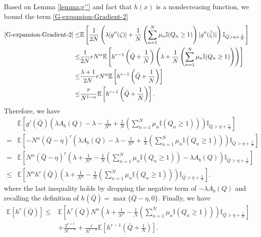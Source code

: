 \documentclass[11pt,oneside,letter]{article}
\begin{document}
Based on Lemma \ref{lemma:g''} and fact that $h(x)$ is a nondecreasing function, we bound the term \eqref{G-expansion-Gradient-2}
\begin{align}
 \eqref{G-expansion-Gradient-2}\leq&  \mathbb{E}\left[\frac{1}{2N}\left(\lambda |g''(\zeta)| + \frac{1}{N}\left(\sum_{n=1}^{N} \mu_n \mathbb{I}(Q_n\geq 1)\right)|g''(\tilde{\zeta})|\right)\mathbb{I}_{\bar Q > \eta+\frac{1}{N}}\right]\\
 \leq &\frac{1}{2N} rN^{\alpha} \mathbb{E}\left[{h^{r-1}}\left(\bar Q +{\frac{1}{N}}\right)\left(\lambda + \frac{1}{N}\left(\sum_{n=1}^{N} \mu_n \mathbb{I}(Q_n\geq 1)\right)\right)\right]\\
  \leq &\frac{\lambda+1}{2N} rN^{\alpha} \mathbb{E}\left[{h^{r-1}}\left(\bar Q +{\frac{1}{N}}\right)\right] \\
 \leq & \frac{r}{N^{1-\alpha}} \mathbb{E}\left[{h^{r-1}}\left(\bar Q +{\frac{1}{N}}\right)\right]. \label{Bound-2}
\end{align}
Therefore, we have 
\begin{align}
&\mathbb{E}\left[g'\left(\bar Q\right)\left(\lambda A_b(Q)- \lambda-\frac{1}{N^{\alpha}}+\frac{1}{N}\left(\sum_{n=1}^{N} \mu_n \mathbb{I}(Q_n\geq 1)\right) \right)\mathbb{I}_{\bar Q> \eta +\frac{1}{N}}\right]\\
=&\mathbb{E}\left[-N^{\alpha} \left(\bar Q-\eta\right)^{r} \left(\lambda A_b(Q)- \lambda-\frac{1}{N^{\alpha}}+\frac{1}{N}\left(\sum_{n=1}^{N} \mu_n \mathbb{I}(Q_n\geq 1)\right) \right)\mathbb{I}_{\bar Q> \eta +\frac{1}{N}}\right] \\
=&\mathbb{E}\left[N^{\alpha} \left(\bar Q-\eta\right)^{r} \left(\lambda+\frac{1}{N^{\alpha}}-\frac{1}{N}\left(\sum_{n=1}^{N} \mu_n \mathbb{I}(Q_n\geq 1)\right) -\lambda A_b(Q) \right)\mathbb{I}_{\bar Q> \eta +\frac{1}{N}}\right] \\
\leq &\mathbb{E}\left[N^{\alpha} h^r(\bar Q) \left(\lambda+\frac{1}{N^{\alpha}}-\frac{1}{N}\left(\sum_{n=1}^{N} \mu_n \mathbb{I}(Q_n\geq 1)\right)  \right)\mathbb{I}_{\bar Q> \eta +\frac{1}{N}}\right].
\end{align}
{where the last inequality holds by dropping the negative term of $-\lambda A_b(Q)$ and recalling the definition of $h(\bar Q)=\max\{\bar Q - \eta, 0\}$.}  
Finally, we have \begin{align}
\mathbb{E}\left[h^r\left(\bar Q\right)\right]
\leq &\mathbb{E}\left[h^r(\bar Q) N^{\alpha} \left(\lambda+\frac{1}{N^{\alpha}}-\frac{1}{N}\left(\sum_{n=1}^{N} \mu_n \mathbb{I}(Q_n\geq 1)\right)  \right)\mathbb{I}_{\bar Q> \eta +\frac{1}{N}}\right] \nonumber\\
&+ \frac{2^{r+1}}{ N^{r-\alpha}} + \frac{r}{N^{1-\alpha}} \mathbb{E}\left[{h^{r-1}}\left(\bar Q +{\frac{1}{N}}\right)\right]. 
\end{align}

\newpage


\end{document}

